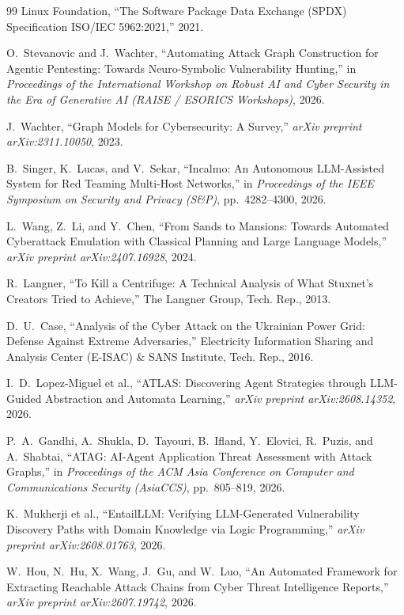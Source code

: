 \documentclass[target=mst,aauheader=aics,style=]{thud}
\begin{document}
\begin{thebibliography}{99}
Linux Foundation,
``The Software Package Data Exchange (SPDX) Specification ISO/IEC 5962:2021,''
2021.

O.~Stevanovic and J.~Wachter,
``Automating Attack Graph Construction for Agentic Pentesting: Towards Neuro-Symbolic Vulnerability Hunting,''
in \emph{Proceedings of the International Workshop on Robust AI and Cyber Security in the Era of Generative AI (RAISE / ESORICS Workshops)}, 2026.

J.~Wachter,
``Graph Models for Cybersecurity: A Survey,''
\emph{arXiv preprint arXiv:2311.10050}, 2023.

B.~Singer, K.~Lucas, and V.~Sekar,
``Incalmo: An Autonomous LLM-Assisted System for Red Teaming Multi-Host Networks,''
in \emph{Proceedings of the IEEE Symposium on Security and Privacy (S\&P)}, pp.~4282--4300, 2026.

L.~Wang, Z.~Li, and Y.~Chen,
``From Sands to Mansions: Towards Automated Cyberattack Emulation with Classical Planning and Large Language Models,''
\emph{arXiv preprint arXiv:2407.16928}, 2024.

R.~Langner,
``To Kill a Centrifuge: A Technical Analysis of What Stuxnet's Creators Tried to Achieve,''
The Langner Group, Tech. Rep., 2013.

D.~U.~Case,
``Analysis of the Cyber Attack on the Ukrainian Power Grid: Defense Against Extreme Adversaries,''
Electricity Information Sharing and Analysis Center (E-ISAC) \& SANS Institute, Tech. Rep., 2016.

I.~D.~Lopez-Miguel et al.,
``ATLAS: Discovering Agent Strategies through LLM-Guided Abstraction and Automata Learning,''
\emph{arXiv preprint arXiv:2608.14352}, 2026.

P.~A.~Gandhi, A.~Shukla, D.~Tayouri, B.~Ifland, Y.~Elovici, R.~Puzis, and A.~Shabtai,
``ATAG: AI-Agent Application Threat Assessment with Attack Graphs,''
in \emph{Proceedings of the ACM Asia Conference on Computer and Communications Security (AsiaCCS)}, pp.~805--819, 2026.

K.~Mukherji et al.,
``EntailLLM: Verifying LLM-Generated Vulnerability Discovery Paths with Domain Knowledge via Logic Programming,''
\emph{arXiv preprint arXiv:2608.01763}, 2026.

W.~Hou, N.~Hu, X.~Wang, J.~Gu, and W.~Luo,
``An Automated Framework for Extracting Reachable Attack Chains from Cyber Threat Intelligence Reports,''
\emph{arXiv preprint arXiv:2607.19742}, 2026.


\end{thebibliography}
\end{document}
